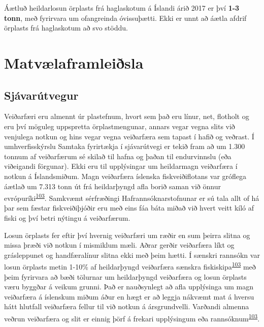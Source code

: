 \documentclass[icelandic,]{book}
\begin{document}
Áætluð heildarlosun örplasts frá haglaskotum á Íslandi árið 2017 er því \textbf{1-3 tonn}, með fyrirvara um ofangreinda óvissuþætti. Ekki er unnt að áætla afdrif örplasts frá haglaskotum að svo stöddu.

\hypertarget{matvlaframleisla}{%
\section*{Matvælaframleiðsla}\label{matvlaframleisla}}

\hypertarget{sjavarutvegur}{%
\subsection*{Sjávarútvegur}\label{sjavarutvegur}}

Veiðarfæri eru almennt úr plastefnum, hvort sem það eru línur, net, flotholt og eru því möguleg uppspretta örplastmengunar, annars vegar vegna slits við venjulega notkun og hins vegar vegna veiðarfæra sem tapast í hafið og veðrast. Í umhverfisskýrslu Samtaka fyrirtækja í sjávarútvegi er tekið fram að um 1.300 tonnum af veiðarfærum sé skilað til hafna og þaðan til endurvinnslu (eða viðeigandi förgunar). Ekki eru til upplýsingar um heildarmagn veiðarfæra í notkun á Íslandsmiðum. Magn veiðarfæra íslenska fiskveiðiflotans var gróflega áætlað um 7.313 tonn út frá heildarþyngd afla borið saman við önnur evrópuríki\textsuperscript{\protect\hyperlink{ref-Hann2018}{103}}. Samkvæmt sérfræðingi Hafrannsóknarstofnunar er sú tala allt of há þar sem fæstar fiskveiðiþjóðir eru með eins fáa báta miðað við hvert veitt kíló af fiski og því betri nýtingu á veiðarfærum.

Losun örplasts fer eftir því hvernig veiðarfæri um ræðir en sum þeirra slitna og missa þræði við notkun í mismiklum mæli. Aðrar gerðir veiðarfæra líkt og grásleppunet og handfæralínur slitna ekki með þeim hætti. Í sænskri rannsókn var losun örplasts metin 1-10\% af heildarþyngd veiðarfæra sænskra fiskiskipa\textsuperscript{\protect\hyperlink{ref-Hann2018}{103}} með þeim fyrirvara að bæði tölurnar um heildarþyngd veiðarfæra og losun örplasts væru byggðar á veikum grunni. Það er nauðsynlegt að afla upplýsinga um magn veiðarfæra á íslenskum miðum áður en hægt er að leggja nákvæmt mat á hversu hátt hlutfall veiðarfæra fellur til við notkun á ársgrundvelli. Varðandi almenna veðrun veiðarfæra og slit er einnig þörf á frekari upplýsingum eða rannsóknum\textsuperscript{\protect\hyperlink{ref-Hann2018}{103}}.
\end{document}
